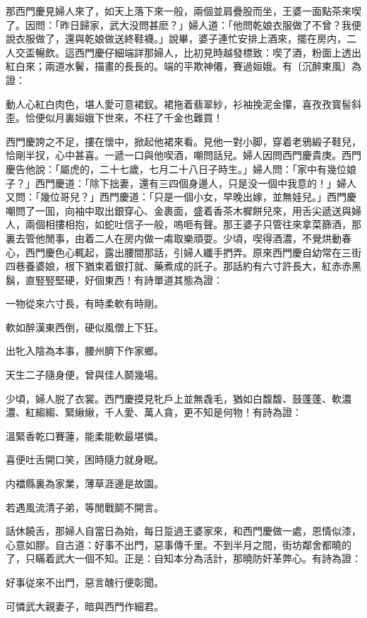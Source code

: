 那西門慶見婦人來了，如天上落下來一般，兩個並肩疊股而坐，王婆一面點茶來喫了。因問：「昨日歸家，武大没問甚麽？」婦人道：「他問乾娘衣服做了不曾？我便說衣服做了，還與乾娘做送終鞋襪。」說畢，婆子連忙安排上酒來，擺在房内，二人交盃暢飲。這西門慶仔細端詳那婦人，比初見時越發標致：喫了酒，粉面上透出紅白來；兩道水鬢，描畫的長長的。端的平欺神僊，賽過姮娥。有〔沉醉東風〕為證：

\begin{myquote}
動人心紅白肉色，堪人愛可意裙釵。裙拖着翡翠紗，衫袖挽泥金攥，喜孜孜寳髻斜歪。恰便似月裏姮娥下世來，不枉了千金也難買！
\end{myquote}

西門慶誇之不足，摟在懷中，掀起他裙來看。見他一對小脚，穿着老鴉緞子鞋兒，恰剛半扠，心中甚喜。一遞一口與他喫酒，嘲問話兒。婦人因問西門慶貴庚。西門慶告他說：「屬虎的，二十七歲，七月二十八日子時生。」婦人問：「家中有幾位娘子？」西門慶道：「除下拙妻，還有三四個身邊人，只是没一個中我意的！」婦人又問：「幾位哥兒？」西門慶道：「只是一個小女，早晚出嫁，並無娃兒。」西門慶嘲問了一囬，向袖中取出銀穿心、金裹面，盛着香茶木樨餅兒來，用舌尖遞送與婦人，兩個相摟相抱，如蛇吐信子一般，嗚咂有聲。那王婆子只管往來拿菜篩酒，那裏去管他閒事，由着二人在房内做一䖏取樂頑耍。少頃，喫得酒濃，不覺烘動春心，西門慶色心輒起，露出腰間那話，引婦人纖手捫弄。原來西門慶自幼常在三街四巷養婆娘，根下猶束着銀打就、藥煮成的託子。那話約有六寸許長大，紅赤赤黑鬍，直竪竪堅硬，好個東西！有詩單道其態為證：

\begin{myquote}
一物從來六寸長，有時柔軟有時剛。

軟如醉漢東西倒，硬似風僧上下狂。

出牝入陰為本事，腰州臍下作家鄉。

天生二子隨身便，曾與佳人鬬幾場。
\end{myquote}

少頃，婦人脱了衣裳。西門慶摸見牝戶上並無毳毛，猶如白馥馥、鼓蓬蓬、軟濃濃、紅縐縐、緊䋺䋺，千人愛、萬人貪，更不知是何物！有詩為證：
\begin{myquote}
溫緊香乾口賽蓮，能柔能軟最堪憐。

喜便吐舌開口笑，困時隨力就身眠。

内襠縣裏為家業，薄草涯邊是故園。

若遇風流清子弟，等閒戰鬬不開言。
\end{myquote}

話休饒舌，那婦人自當日為始，每日踅過王婆家來，和西門慶做一處，恩情似漆，心意如膠。自古道：好事不出門，惡事傳千里。不到半月之間，街坊鄰舍都曉的了，只瞞着武大一個不知。正是：自知本分為活計，那曉防奸革弊心。有詩為證：
\begin{myquote}
好事従來不出門，惡言醜行便彰聞。

可憐武大親妻子，暗與西門作細君。
\end{myquote}

